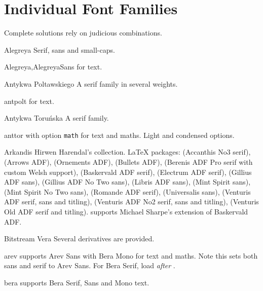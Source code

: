 \documentclass[a4paper,welsh,british,twocolumn]{article}
\begin{document}
\section{Individual Font Families}\label{sec:ind}
Complete solutions rely on judicious combinations.
\begin{fontopts}
  \item[Alegreya] Serif, sans and small-caps.
  \begin{pkgdescription}
    \item[Alegreya,AlegreyaSans] for text.
  \end{pkgdescription}
  \item[Antykwa Poltawskiego] A serif family in several weights.
  \begin{pkgdescription}
    \item[antpolt] for text.
  \end{pkgdescription}
  \item[Antykwa Toruńska] A serif family.
  \begin{pkgdescription}
    \item[anttor] with option \verb|math| for text and maths.
	Light and condensed options.
  \end{pkgdescription}
  \item[Arkandis] Hirwen Harendal's collection.
  \LaTeX{} packages:  (Accan\-this No3 serif),  (Arrows ADF),  (Ornements ADF),  (Bullets ADF),  (Berenis ADF Pro serif with custom Welsh support),  (Baskervald ADF serif),  (Electrum ADF serif),  (Gillius ADF sans),  (Gill\-ius ADF No Two sans),  (Libris ADF sans),  (Mint Spirit sans),  (Mint Spirit No Two sans),  (Romande ADF serif),  (Universalis sans),  (Venturis ADF serif, sans and titling),  (Venturis ADF No2 serif, sans and titling),  (Venturis Old ADF serif and titling).
   supports Michael Sharpe's extension of Baskervald ADF.
  \item[Bitstream Vera] Several derivatives are provided.
  \begin{pkgdescription}
    \item[arev] supports Arev Sans with Bera Mono for text and maths.
	Note this sets both sans and serif to Arev Sans.
	For Bera Serif, load  \emph{after} .
	\item[bera] supports Bera Serif, Sans and Mono text.

\end{pkgdescription}
\end{fontopts}
\end{document}

